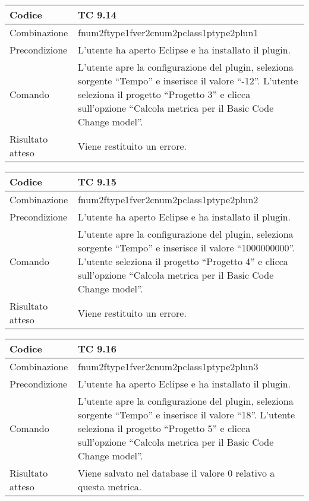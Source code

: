 \begin{table}[ht]
\begin{tabular}{|p{3cm}|p{9cm}|}
\hline
\cellcolor{lightgray}Codice				& TC 9.14								\\
\hline
\cellcolor{lightgray}Combinazione		& fnum2ftype1fver2cnum2pclass1ptype2plun1									\\
\hline
\cellcolor{lightgray}Precondizione		& L'utente ha aperto Eclipse e ha installato il plugin.		\\
\hline
\cellcolor{lightgray}Comando			& L'utente apre la configurazione del plugin, seleziona sorgente ``Tempo'' e inserisce il valore ``-12''. L'utente seleziona il progetto ``Progetto 3''  e clicca sull'opzione ``Calcola metrica per il Basic Code Change model''.	\\
\hline
\cellcolor{lightgray}Risultato atteso	& Viene restituito un errore.\\
\hline
\end{tabular}
\end{table}


\begin{table}[ht]
\begin{tabular}{|p{3cm}|p{9cm}|}
\hline
\cellcolor{lightgray}Codice				& TC 9.15								\\
\hline
\cellcolor{lightgray}Combinazione		& fnum2ftype1fver2cnum2pclass1ptype2plun2									\\
\hline
\cellcolor{lightgray}Precondizione		& L'utente ha aperto Eclipse e ha installato il plugin.		\\
\hline
\cellcolor{lightgray}Comando			& L'utente apre la configurazione del plugin, seleziona sorgente ``Tempo'' e inserisce il valore ``1000000000''. L'utente seleziona il progetto ``Progetto 4''  e clicca sull'opzione ``Calcola metrica per il Basic Code Change model''.	\\
\hline
\cellcolor{lightgray}Risultato atteso	& Viene restituito un errore.\\
\hline
\end{tabular}
\end{table}


\begin{table}[ht]
\begin{tabular}{|p{3cm}|p{9cm}|}
\hline
\cellcolor{lightgray}Codice				& TC 9.16								\\
\hline
\cellcolor{lightgray}Combinazione		& fnum2ftype1fver2cnum2pclass1ptype2plun3									\\
\hline
\cellcolor{lightgray}Precondizione		& L'utente ha aperto Eclipse e ha installato il plugin.		\\
\hline
\cellcolor{lightgray}Comando			& L'utente apre la configurazione del plugin, seleziona sorgente ``Tempo'' e inserisce il valore ``18''. L'utente seleziona il progetto ``Progetto 5''  e clicca sull'opzione ``Calcola metrica per il Basic Code Change model''.	\\
\hline
\cellcolor{lightgray}Risultato atteso	& Viene salvato nel database il valore 0 relativo a questa metrica.\\
\hline
\end{tabular}
\end{table}


